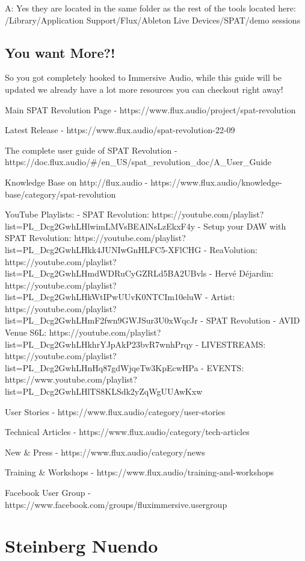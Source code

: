 \documentclass[
  letterpaper,
  DIV=11,
  numbers=noendperiod]{scrreport}
\begin{document}
A: Yes they are located in the same folder as the rest of the tools
located here: /Library/Application Support/Flux/Ableton Live
Devices/SPAT/demo sessions

\hypertarget{you-want-more}{%
\section{You want More?!}\label{you-want-more}}

So you got completely hooked to Immersive Audio, while this guide will
be updated we already have a lot more resources you can checkout right
away!

Main SPAT Revolution Page -
https://www.flux.audio/project/spat-revolution

Latest Release - https://www.flux.audio/spat-revolution-22-09

The complete user guide of SPAT Revolution -
https://doc.flux.audio/\#/en\_US/spat\_revolution\_doc/A\_User\_Guide

Knowledge Base on http://flux.audio -
https://www.flux.audio/knowledge-base/category/spat-revolution

YouTube Playlists: - SPAT Revolution:
https://youtube.com/playlist?list=PL\_Dcg2GwhLHlwimLMVsBEAlNsLzEkxF4y -
Setup your DAW with SPAT Revolution:
https://youtube.com/playlist?list=PL\_Dcg2GwhLHkk4JUNIwGnHLFC5-XFlCHG -
ReaVolution:
https://youtube.com/playlist?list=PL\_Dcg2GwhLHmdWDRuCyGZRLd5BA2UBvls -
Hervé Déjardin:
https://youtube.com/playlist?list=PL\_Dcg2GwhLHkWtIPwUUvK0NTCIm10eluW -
Artist:
https://youtube.com/playlist?list=PL\_Dcg2GwhLHmF2fwn9GWJSur3U0xWqcJr -
SPAT Revolution - AVID Venue S6L:
https://youtube.com/playlist?list=PL\_Dcg2GwhLHkhrYJpAkP23bvR7wnhPrqy -
LIVESTREAMS:
https://youtube.com/playlist?list=PL\_Dcg2GwhLHnHq87gdWjqeTw3KpEcwHPa -
EVENTS:
https://www.youtube.com/playlist?list=PL\_Dcg2GwhLHlTS8KLSdk2yZqWgUUAwKxw

User Stories - https://www.flux.audio/category/user-stories

Technical Articles - https://www.flux.audio/category/tech-articles

New \& Press - https://www.flux.audio/category/news

Training \& Workshops - https://www.flux.audio/training-and-workshops

Facebook User Group -
https://www.facebook.com/groups/fluximmersive.usergroup

\hypertarget{steinberg-nuendo}{%
\chapter{Steinberg Nuendo}\label{steinberg-nuendo}}
\end{document}
